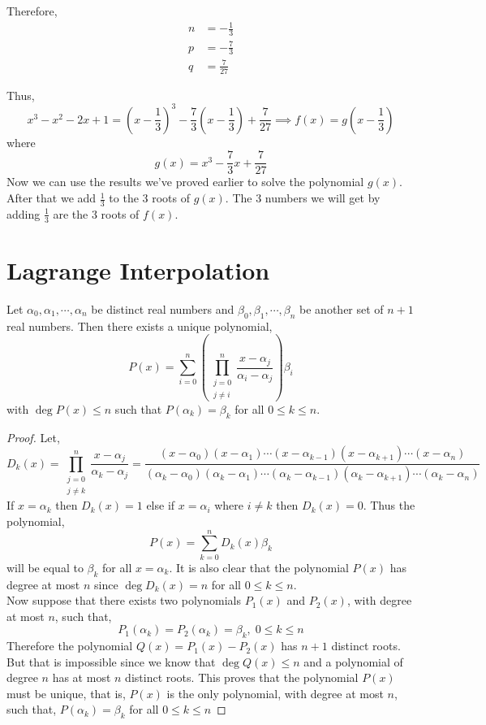 \documentclass[11pt,numbers=noenddot,svgnames]{scrbook}
\DeclareMathOperator{\Deg}{deg}
\begin{document}
Therefore,
\begin{align*}
   n &= -\frac{1}{3} \\
   p &= -\frac{7}{3}\\
   q &=  \frac{7}{27}
\end{align*}

Thus,
\[
    x^{3} - x^{2} -2x +1 = \left(x - \frac{1}{3}\right)^{3} -\frac{7}{3}\left(x - \frac{1}{3}\right) +\frac{7}{27} \implies f(x) = g\left(x - \frac{1}{3}\right)
\]
where \[ g(x) = x^{3} - \frac{7}{3}x + \frac{7}{27} \]
Now we can use the results we've proved earlier to solve the polynomial $g(x)$. After that we add $\frac{1}{3}$ to the 3 roots 
of $g(x)$. The 3 numbers we will get by adding $\frac{1}{3}$ are the 3 roots of $f(x)$.

\section{Lagrange Interpolation}

\begin{theorem}\label{thm:lagrange-interpol}
    Let $\alpha_{0}, \alpha_{1},\cdots , \alpha_{n}$ be distinct real numbers and 
    $\beta_{0}, \beta_{1}, \cdots, \beta_{n}$ be another set of $n+1$ real numbers. 
    Then there exists a unique polynomial,
    \[
    P(x) = \sum_{i=0}^{n} \left( \prod_{\substack{j=0\\ j\neq i}}^{n} \frac{x - \alpha_{j}}{\alpha_{i} - \alpha_{j}} \right) \beta_{i}
    \]
    with $\Deg P(x) \leq n$ such that $P(\alpha_{k}) = \beta_{k}$ for all $0\leq k \leq n$.
\end{theorem}
\begin{proof}
    Let,
    \[
    D_{k}(x) = \prod_{\substack{j=0 \\ j\neq k}}^{n} \frac{x - \alpha_{j}}{\alpha_{k} - \alpha_{j}} = 
    \frac{(x-\alpha_{0})(x-\alpha_{1})\cdots (x - \alpha_{k-1})(x - \alpha_{k+1}) \cdots (x - \alpha_{n})}
         {(\alpha_{k}-\alpha_{0})(\alpha_{k}-\alpha_{1})\cdots (\alpha_{k} - \alpha_{k-1})(\alpha_{k} - \alpha_{k+1}) \cdots (\alpha_{k} - \alpha_{n})}
    \]
    If $x=\alpha_k$ then $D_k(x) = 1$ else if $x=\alpha_i$ where 
    $i \neq k$ then $D_k(x)=0$. Thus the polynomial,
    \[ P(x) = \sum_{k=0}^n D_k(x) \beta_k \]
    will be equal to $\beta_k$ for all $x=\alpha_k$. It is also clear that the 
    polynomial $P(x)$ has degree at most $n$ since $\Deg D_k(x)=n$ for all 
    $0 \leq k \leq n$. \\
    Now suppose that there exists two polynomials $P_1(x)$ and $P_2(x)$, with degree at 
    most $n$, such that,
    \[ P_1(\alpha_k) = P_2(\alpha_k) = \beta_k, \; 0\leq k \leq n\]
    Therefore the polynomial $Q(x) = P_1(x) - P_2(x)$ has $n+1$ distinct roots. 
    But that is impossible since we know that $\Deg Q(x) \leq n$ and 
    a polynomial of degree $n$ has at most $n$ distinct roots. This proves that 
    the polynomial $P(x)$ must be unique, that is, $P(x)$ is the only polynomial, with 
    degree at most $n$, such that, 
    $P(\alpha_k) = \beta_k$ for all $0 \leq k \leq n$
\end{proof}
\end{document}
